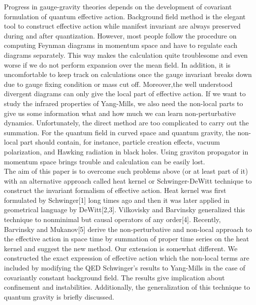 \documentclass[a4paper,12 pt]{article}
\begin{document}
Progress in gauge-gravity theories depends on the development of
covariant formulation of quantum effective action. Background
field method is the elegant tool to construct effective action
while manifest invariant are always preserved during and after
quantization. However, most people follow the procedure on
computing Feynman diagrams in momentum space and have to regulate
each diagrams separately. This way makes the calculation quite
troublesome and even worse if we do not perform expansion over the
mean field. In addition, it is uncomfortable to keep track on
calculations once the gauge invariant breaks down due to gauge
fixing condition or mass cut off. Moreover,the well understood
divergent diagrams can only give the local part of effective
action. If we want to study the infrared properties of Yang-Mills,
we also need the non-local parts to give us some information what
and how much we can learn non-perturbative dynamics.
Unfortunately, the direct method are too complicated to carry out
the summation. For the quantum field in curved space and quantum
gravity, the non-local part should contain, for instance, particle
creation effects, vacuum polarization, and Hawking radiation in
black holes. Using graviton propagator in momentum space brings
trouble and calculation can be easily lost.\\
The aim of this paper is to overcome such problems above (or at
least part of it) with an alternative approach called heat kernel
or Schwinger-DeWitt technique to construct the invariant formalism
of effective action. Heat kernel was first formulated by
Schwinger[1] long times ago and then it was later applied in
geometrical language by DeWitt[2,3]. Vilkovisky and Barvinsky
generalized this technique to nonminimal but causal operators of
any order[4]. Recently, Barvinsky and Mukanov[5] derive the
non-perturbative and non-local approach to the effective action in
space time \coordHE{} by summation of proper time series on the heat kernel and
suggest the new method. Our extension is somewhat different. We
constructed the exact expression of effective action which the
non-local terms are included by modifying the QED Schwinger's
results to Yang-Mills in the case of covariantly constant
background field. The results give implication about confinement
and instabilities. Additionally, the generalization of this
technique to quantum gravity is briefly discussed.
\end{document}
